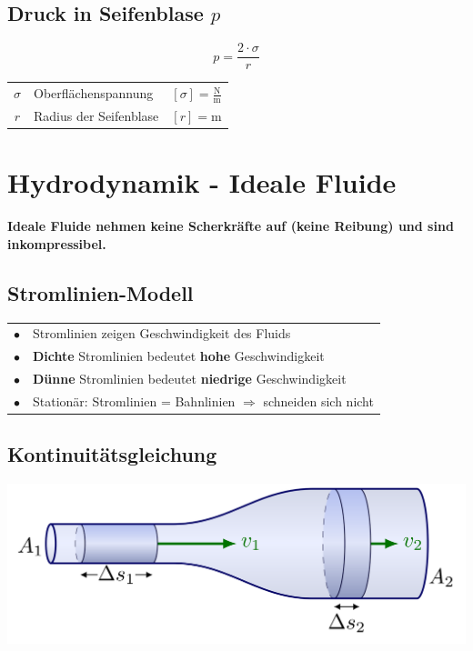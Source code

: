 \subsection{Druck in Seifenblase $p$}

$$ \boxed{ p = \frac{2 \cdot \sigma}{r} } $$ 


	\begin{tabular}{c l c}
		\rule{0pt}{8pt}$\sigma$ & Oberflächenspannung & $[\sigma] = \mathrm{\frac{N}{m}}$ \\
		$r$ & Radius der Seifenblase & $[r] = \mathrm{m}$  \\
	\end{tabular}







\section{Hydrodynamik - Ideale Fluide}

\textbf{Ideale Fluide nehmen keine Scherkräfte auf (keine Reibung) und sind inkompressibel.}

\subsection{Stromlinien-Modell}

\begin{tabular}{ll}
$\bullet$ & Stromlinien zeigen Geschwindigkeit des Fluids \\
$\bullet$ & \textbf{Dichte} Stromlinien bedeutet \textbf{hohe} Geschwindigkeit \\
$\bullet$ & \textbf{Dünne} Stromlinien bedeutet \textbf{niedrige} Geschwindigkeit \\
$\bullet$ & Stationär: Stromlinien = Bahnlinien $\Rightarrow$ schneiden sich nicht 
\end{tabular}




\subsection{Kontinuitätsgleichung}


\includegraphics[width=0.7\linewidth]{Bilder/Kontinuitaet.png}


